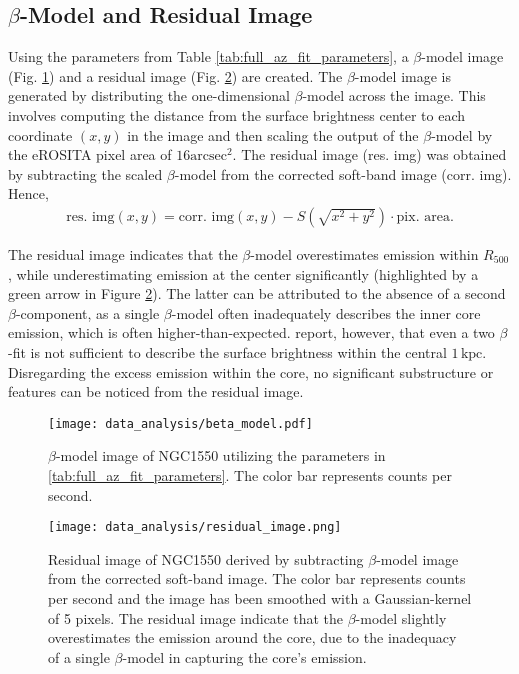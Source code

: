 \subsection{\(\beta\)-Model and Residual Image}
Using the parameters from Table \ref{tab:full_az_fit_parameters}, a \(\beta\)-model image (Fig. \ref{fig:beta_model}) and a residual image (Fig. \ref{fig:residual_image}) are created. The \(\beta\)-model image is generated by distributing the one-dimensional \(\beta\)-model across the image. This involves computing the distance from the surface brightness center to each coordinate \((x, y)\) in the image and then scaling the output of the \(\beta\)-model by the eROSITA pixel area of \(16\text{arcsec}^2\). The residual image (res. img) was obtained by subtracting the scaled \(\beta\)-model from the corrected soft-band image (corr. img). Hence,
\begin{align*}
    \text{res. img}(x, y) = \text{corr. img}(x, y) - S\left(\sqrt{x^2 + y^2}\right) \cdot \text{pix. area}.
\end{align*}

The residual image indicates that the \(\beta\)-model overestimates emission within \(R_{500}\), while underestimating emission at the center significantly (highlighted by a green arrow in Figure \ref{fig:residual_image}). The latter can be attributed to the absence of a second \(\beta\)-component, as a single \(\beta\)-model often inadequately describes the inner core emission, which is often higher-than-expected. \citep{Sun_2003} report, however, that even a two \(\beta\)-fit is not sufficient to describe the surface brightness within the central \(1\,\text{kpc}\). Disregarding the excess emission within the core, no significant substructure or features can be noticed from the residual image.
\begin{figure}[htbp]
    \centering
    \texttt{[image: data\_analysis/beta\_model.pdf]}
    \caption[\(\beta\)-model image of NGC1550.]{\(\beta\)-model image of NGC1550 utilizing the parameters in \ref{tab:full_az_fit_parameters}. The color bar represents counts per second.}
    \label{fig:beta_model}
\end{figure}
\begin{figure}[htbp]
    \centering
    \texttt{[image: data\_analysis/residual\_image.png]}
    \caption[Residual image of NGC1550.]{Residual image of NGC1550 derived by subtracting \(\beta\)-model image from the corrected soft-band image. The color bar represents counts per second and the image has been smoothed with a Gaussian-kernel of 5 pixels. The residual image indicate that the \(\beta\)-model slightly overestimates the emission around the core, due to the inadequacy of a single \(\beta\)-model in capturing the core's emission.}
    \label{fig:residual_image}
\end{figure}

